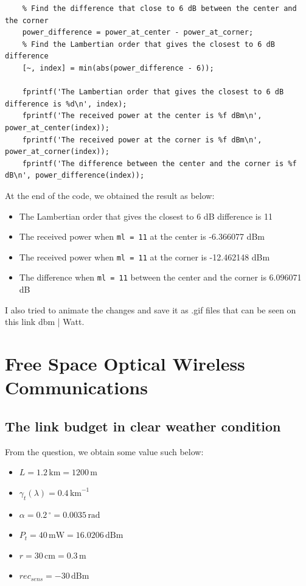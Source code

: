 \documentclass[12pt]{article}
\begin{document}
\begin{lstlisting}
    % Find the difference that close to 6 dB between the center and the corner
    power_difference = power_at_center - power_at_corner;
    % Find the Lambertian order that gives the closest to 6 dB difference
    [~, index] = min(abs(power_difference - 6));
    
    fprintf('The Lambertian order that gives the closest to 6 dB difference is %d\n', index);
    fprintf('The received power at the center is %f dBm\n', power_at_center(index));
    fprintf('The received power at the corner is %f dBm\n', power_at_corner(index));
    fprintf('The difference between the center and the corner is %f dB\n', power_difference(index));
    \end{lstlisting}

    At the end of the code, we obtained the result as below:

    \begin{itemize}
        \item The Lambertian order that gives the closest to 6 dB difference is 11
        \item The received power when \texttt{ml = 11} at the center is -6.366077 dBm
        \item The received power when \texttt{ml = 11} at the corner is -12.462148 dBm
        \item The difference when \texttt{ml = 11} between the center and the corner is 6.096071 dB
    \end{itemize}

    I also tried to animate the changes and save it as .gif files that can be seen on this link dbm | Watt.
    
    
\section{Free Space Optical Wireless Communications}
\subsection{The link budget in clear weather condition}
		From the question, we obtain some value such below:
\begin{itemize}
    \item $\textit{L} = 1.2\, \text{km} = 1200\, \text{m}$
    \item $\gamma_{t}(\lambda) = 0.4\, \text{km}^{-1}$
    \item $\alpha = 0.2\,^\circ = 0.0035\, \text{rad}$
    \item $P_{t} = 40\, \text{mW} = 16.0206\, \text{dBm}$
    \item $\textit{r} = 30\, \text{cm} = 0.3\, \text{m}$
    \item $\textit{rec}_{sens} = -30\, \text{dBm}$
\end{itemize}
\end{document}
